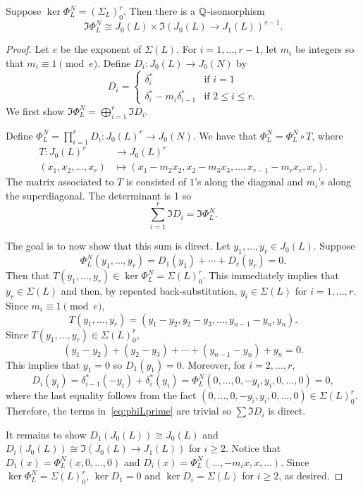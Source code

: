 \begin{proposition}
    \label{prop:decomp}
    Suppose $\ker\Phi_L ^N=(\Sigma_L)_0 ^r$. Then there is a $\mathbb{Q}$-isomorphism
    \[
        \Im\Phi_L ^N \cong J_0(L)\times \Im(J_0(L)\to J_1(L))^{r-1}.
    \]
\end{proposition}
\begin{proof}
    Let $e$ be the exponent of $\Sigma(L)$. For $i=1,\ldots,r-1$, let $m_i$ be
    integers so that $m_i \equiv 1 \pmod{e}$. Define $D_i:J_0(L)\to J_0(N)$ by
    \[
        D_i =
        \begin{cases}
            \delta_i ^*                   & \text{if } i = 1\\
            \delta_i ^* - m_i \delta_{i-1} ^* & \text{if } 2\leq i \leq r.
        \end{cases}
    \]
    We first show $\Im\Phi_L ^N = \bigoplus_{i=1} ^r \Im D_i$.

    Define $\Phi_L ^N =\prod_{i=1} ^r D_i : J_0(L)^r \to J_0(N)$. We have that
    $\Phi_L ^N = \Phi_L ^N \circ T$, where
    \begin{align*}
        T:J_0(L)^r & \to J_0(L)^r \\
        (x_1,x_2,\ldots,x_r)&\mapsto (x_1-m_2x_2,x_2-m_3 x_3,\ldots,x_{r-1}-m_r
        x_r, x_r).
    \end{align*}
    The matrix associated to $T$ is consisted of $1$'s along the diagonal and
    $m_i$'s along the superdiagonal. The determinant is 1 so
    \[
        \sum_{i=1} ^r \Im D_i = \Im \Phi_L ^N.
    \]

    The goal is to now show that this sum is direct. Let $y_1,\ldots,y_r\in
    J_0(L)$. Suppose
    \begin{equation}
        \label{eq:phiLprime}
        \Phi_L ^N (y_1,\ldots,y_r) =D_1(y_1)+ \cdots +D_r(y_r)=0.
    \end{equation}
    Then that $T(y_1,\ldots,y_r)\in \ker\Phi_L ^N=\Sigma(L)_0 ^r$.  This
    immediately implies that $y_r\in \Sigma(L)$ and then, by repeated
    back-substitution, $y_i\in \Sigma(L)$ for $i=1,\ldots,r$. Since $m_i \equiv
    1 \pmod{e}$,
    \[
        T(y_1,\ldots,y_r)=(y_1-y_2,y_2-y_3,\ldots,y_{n-1}-y_n,y_n).
    \]
    Since $T(y_1,\ldots,y_r)\in \Sigma(L)_0 ^r$,
    \[
        (y_1-y_2)+(y_2-y_3)+\cdots+(y_{n-1}-y_n)+y_n =0.
    \]
    This implies that $y_1=0$ so $D_1(y_1)=0$. Moreover, for $i=2,\ldots,r$,
    \begin{equation*}
        D_i(y_i)
            = \delta_{i-1} ^*(-y_i) + \delta_i ^* (y_i)
            = \Phi_L ^N (0,\ldots,0,-y_i,y_i,0,\ldots,0)
            = 0,
    \end{equation*}
    where the last equality follows from the fact
    $(0,\ldots,0,-y_i,y_i,0,\ldots,0)\in \Sigma(L)_0 ^r$. Therefore, the terms
    in~\eqref{eq:phiLprime} are trivial so $\sum \Im D_i$ is direct.

    It remains to show $D_1(J_0(L))\cong J_0(L)$ and $D_i(J_0(L))\cong
    \Im(J_0(L)\to J_1(L))$ for $i\geq 2$. Notice that $D_1(x)=\Phi_L
    ^N(x,0,\ldots,0)$ and $D_i(x)=\Phi_L ^N(\ldots,-m_ix,x,\ldots)$. Since
    $\ker\Phi_L ^N=\Sigma(L)_0 ^r$, $\ker D_1=0$ and $\ker D_i=\Sigma(L)$ for
    $i\geq 2$, as desired.
\end{proof}

